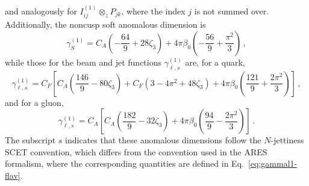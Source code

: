 and analogously for $I_{ij}^{(1)}\otimes_z P_{jk}$, where the index $j$ is not summed over. 
Additionally,  the noncusp soft anomalous dimension is
\begin{equation}
\gamma_S^{(1)}=C_A\left(-\frac{64}{9}+28\zeta_3\right)+4\pi\beta_0\left(-\frac{56}{9}+\frac{\pi^2}{3}\right)\,,
\end{equation}
while those for the beam and jet functions $\gamma^{(1)}_{\ell,s}$ are, for a quark,
\begin{equation}
\gamma_{\ell,s}^{(1)}=C_F\left[C_A\left(\frac{146}{9}-80\zeta_3\right)+C_F(3-4\pi^2+48\zeta_3)+4\pi\beta_0\left(\frac{121}{9}+\frac{2\pi^2}{3}\right)\right]\,,
\end{equation}
and for a gluon,
\begin{equation}
\gamma_{\ell,s}^{(1)}=C_A\left[C_A\left(\frac{182}{9}-32\zeta_3\right)+4\pi\beta_0\left(\frac{94}{9}-\frac{2\pi^2}{3}\right)\right]\,.
\end{equation}
The subscript $s$ indicates that these anomalous dimensions follow the
$N$-jettiness SCET convention, which differs from the convention used in
the \textsc{ARES} formalism, where the corresponding quantities are defined
in Eq.~\eqref{eq:gammal1-flav}.



